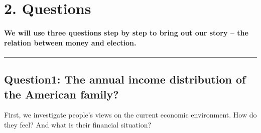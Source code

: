 \documentclass[
]{article}
\begin{document}
\hypertarget{questions}{%
\section{2. Questions}\label{questions}}

\hypertarget{we-will-use-three-questions-step-by-step-to-bring-out-our-story-the-relation-between-money-and-election.}{%
\paragraph{We will use three questions step by step to bring out our
story -- the relation between money and
election.}\label{we-will-use-three-questions-step-by-step-to-bring-out-our-story-the-relation-between-money-and-election.}}

\begin{center}\rule{0.5\linewidth}{0.5pt}\end{center}

\hypertarget{question1-the-annual-income-distribution-of-the-american-family}{%
\subsection{Question1: The annual income distribution of the American
family?}\label{question1-the-annual-income-distribution-of-the-american-family}}

First, we investigate people's views on the current economic
environment. How do they feel? And what is their financial situation?
\end{document}
